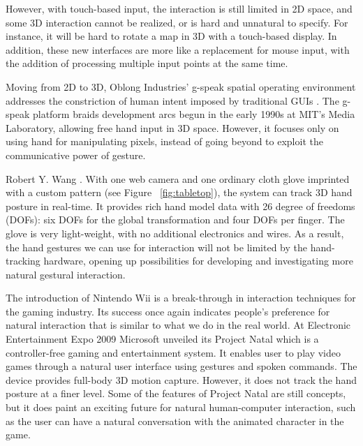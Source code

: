 However, with 
touch-based input, the interaction is still limited in 2D space, and some 3D 
interaction cannot be realized, or is hard and unnatural to specify. For 
instance, it will be hard to rotate a map in 3D with a touch-based display. In 
addition, these new interfaces are more like a replacement for mouse input, with
the addition of processing multiple input points at the same time.

Moving from 2D to 3D, Oblong Industries' g-speak spatial operating environment 
addresses the constriction of human intent imposed by traditional GUIs 
\cite{Oblong09}. The g-speak platform braids development arcs begun in the early
1990s at MIT's Media Laboratory, allowing free hand input in 3D space. However, 
it focuses only on using hand for manipulating pixels, instead of going beyond 
to exploit the communicative power of gesture.

Robert Y. Wang \cite{Wang09}. With one web camera and one ordinary cloth glove imprinted with a custom pattern (see Figure ~\ref{fig:tabletop}), the system can track 3D hand posture in real-time. It provides rich hand model data with 26 degree of freedoms (DOFs): six DOFs for the global transformation and four DOFs per finger. The glove is very light-weight, with no additional electronics and wires. As a result, the hand gestures we can use for interaction will not be limited by the hand-tracking hardware, opening up possibilities for developing and investigating more natural gestural interaction.

The introduction of Nintendo Wii is a break-through in interaction techniques for the gaming industry. Its success once again indicates people's preference for natural interaction that is similar to what we do in the real world. At Electronic Entertainment Expo 2009 Microsoft unveiled its Project Natal which is a controller-free gaming and entertainment system. It enables user to play video games through a natural user interface using gestures and spoken commands. The device provides full-body 3D motion capture. However, it does not track the hand posture at a finer level. Some of the features of Project Natal are still concepts, but it does paint an exciting future for natural human-computer interaction, such as the user can have a natural conversation with the animated character in the game.


